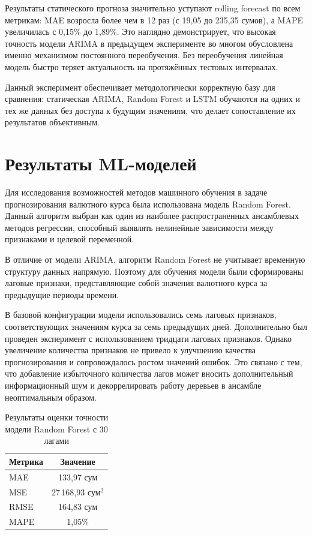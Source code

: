 Результаты статического прогноза значительно уступают rolling forecast по всем метрикам: MAE возросла более чем в 12 раз (с 19,05 до 235,35 сумов), а MAPE увеличилась с 0,15\% до 1,89\%. Это наглядно демонстрирует, что высокая точность модели ARIMA в предыдущем эксперименте во многом обусловлена именно механизмом постоянного переобучения. Без переобучения линейная модель быстро теряет актуальность на протяжённых тестовых интервалах.

Данный эксперимент обеспечивает методологически корректную базу для сравнения: статическая ARIMA, Random Forest и LSTM обучаются на одних и тех же данных без доступа к будущим значениям, что делает сопоставление их результатов объективным.

\section{Результаты ML-моделей}
Для исследования возможностей методов машинного обучения в задаче прогнозирования валютного курса была использована модель Random Forest. Данный алгоритм выбран как один из наиболее распространенных ансамблевых методов регрессии, способный выявлять нелинейные зависимости между признаками и целевой переменной.

В отличие от модели ARIMA, алгоритм Random Forest не учитывает временную структуру данных напрямую. Поэтому для обучения модели были сформированы лаговые признаки, представляющие собой значения валютного курса за предыдущие периоды времени.

В базовой конфигурации модели использовались семь лаговых признаков, соответствующих значениям курса за семь предыдущих дней. Дополнительно был проведен эксперимент с использованием тридцати лаговых признаков. Однако увеличение количества признаков не привело к улучшению качества прогнозирования и сопровождалось ростом значений ошибок. Это связано с тем, что добавление избыточного количества лагов может вносить дополнительный информационный шум и декоррелировать работу деревьев в ансамбле неоптимальным образом. 
\begin{table}[h!]
\centering
\caption{Результаты оценки точности модели Random Forest с 30 лагами}
\label{tab:rf30_lag}
\begin{tabular}{|l|c|}
\hline
\textbf{Метрика} & \textbf{Значение} \\ \hline
MAE  & 133{,}97 сум \\ \hline
MSE  & 27\,168{,}93 сум$^2$ \\ \hline
RMSE & 164{,}83 сум \\ \hline
MAPE & 1{,}05\% \\ \hline
\end{tabular}
\end{table}

